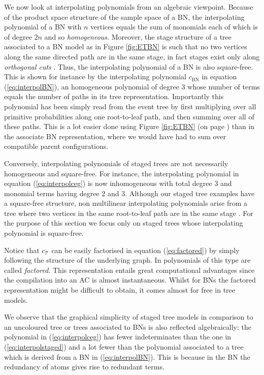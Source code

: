 {We now look at interpolating polynomials from an algebraic viewpoint. Because of the product space structure of the sample space of a BN, the interpolating polynomial of a BN with $n$ vertices equals the sum of  monomials each of which is of degree $2n$ and so \emph{homogeneous}. Moreover, the stage structure of a tree associated to a BN model as in Figure \ref{fig:ETBN} is such that no two vertices along the same directed path are in the same stage, in fact stages exist only along \emph{orthogonal cuts} \citep{Thwaites2015}. Thus, the interpolating polynomial of a BN is also square-free. This is shown for instance by the interpolating polynomial $c_{\text{BN}}$ in equation (\ref{eq:interpolBN}),  an homogeneous polynomial of degree $3$ whose number of terms equals the number of paths in its tree representation.  Importantly this polynomial has been simply read from the event tree by first multiplying over all primitive probabilities along one root-to-leaf path, and then summing over all of these paths. This is a lot easier done using Figure \ref{fig:ETBN} (on page \pageref{fig:ETBN}) than in the associate BN representation, where we would have had to sum over compatible parent configurations.

Conversely, interpolating polynomials of staged trees are not necessarily homogeneous and  square-free. For instance, the interpolating polynomial in equation (\ref{eq:interpolceg}) is now inhomogeneous with total degree $3$ and monomial terms having degree $2$ and $3$. Although our staged tree examples have a square-free structure, non multilinear interpolating polynomials arise from a tree where two vertices  in the same root-to-leaf path are in the same stage \citep[as shown in][]{Gorgen2015}. For the purpose of this section we focus only on staged trees whose interpolating polynomial is square-free.

 Notice that $c_\mathcal{T}$ can be easily factorised in equation (\ref{eq:factored}) by simply following the structure of the underlying graph. In \cite{Brandherm2004} polynomials of this type are called \textit{factored}. This representation entails great computational advantages since the compilation into an AC is almost instantaneous. Whilst for BNs the factored representation might be difficult to obtain, it comes almost for free in tree models. 

We observe that the graphical simplicity of  staged tree models in comparison to an uncoloured tree or trees associated to BNs is also reflected algebraically: the polynomial in (\ref{eq:interpolceg}) has fewer indeterminates than the one in (\ref{eq:interpolstaged}) and a lot fewer than the polynomial associated to a tree which is derived from a BN in (\ref{eq:interpolBN}). This is because in the BN the redundancy of atoms gives rise to redundant terms. 

}
